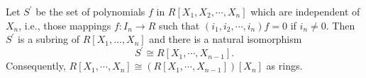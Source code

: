 Let $S^\prime$ be the set of polynomials $f$ in $R[X_1, X_2, \cdots, X_n]$ which are independent of $X_n$, i.e., those mappings $f: I_n \to R$ such that $(i_1, i_2, \cdots, i_n)f = 0$ if $i_n \neq 0$. Then $S^\prime$ is a subring of $R[X_1, \dots, X_n]$ and there is a natural isomorphism
$$S^\prime \cong R[X_1, \cdots, X_{n-1}].$$
Consequently, $R[X_1, \cdots, X_n] \cong (R[X_1, \cdots, X_{n-1}])[X_n]$ as rings.
